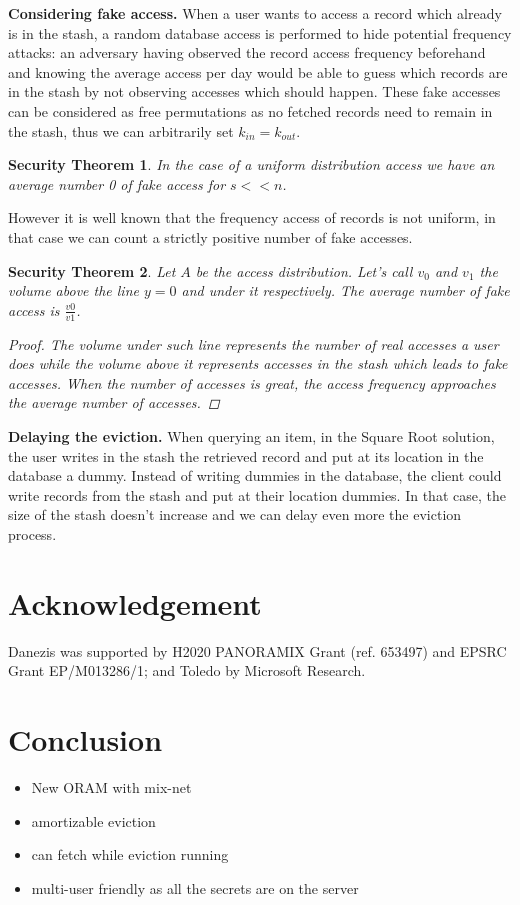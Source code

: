 \documentclass{llncs}
\newtheorem{secthm}{Security Theorem}
\begin{document}
\noindent\textbf{Considering fake access.} When a user wants to access a record which already is in the stash, a random database access is performed to hide potential frequency attacks: an adversary having observed the record access frequency beforehand and knowing the average access per day would be able to guess which records are in the stash by not observing accesses which should happen.
These fake accesses can be considered as free permutations as no fetched records need to remain in the stash, thus we can arbitrarily set $k_{in}=k_{out}$.\\

\begin{secthm}
In the case of a uniform distribution access we have an average number 0 of fake access for $s<<n$.\\
\end{secthm}

However it is well known that the frequency access of records is not uniform, in that case we can count a strictly positive number of fake accesses.
\begin{secthm}
Let $A$ be the access distribution. Let's call $v_0$ and $v_1$ the volume above the line $y=0$ and under it respectively.
The average number of fake access is $ \frac{v0}{v1}$.
\begin{proof}
 The volume under such line represents the number of real accesses a user does while the volume above it represents accesses in the stash which leads to fake accesses.
 When the number of accesses is great, the access frequency approaches the average number of accesses.
\end{proof}
\end{secthm}

\noindent\textbf{Delaying the eviction.} When querying an item, in the Square Root solution, the user writes in the stash the retrieved record and put at its location in the database a dummy. Instead of writing dummies in the database, the client could write records from the stash and put at their location dummies. In that case, the size of the stash doesn't increase and we can delay even more the eviction process.


\section{Acknowledgement}
Danezis was supported by H2020  PANORAMIX Grant (ref. 653497) and EPSRC Grant EP/M013286/1; and Toledo by Microsoft Research.


\section{Conclusion}
\label{Conclusion}
\begin{itemize}
 \item New ORAM with mix-net
 \item amortizable eviction
 \item can fetch while eviction running
 \item multi-user friendly as all the secrets are on the server
\end{itemize}
\end{document}
